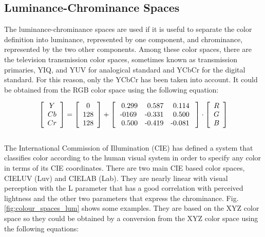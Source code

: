 \documentclass[final,a4paper,12pt,english]{UnicaPhdThesis3}
\begin{document}
\subsection{Luminance-Chrominance Spaces}  %
The luminance-chrominance spaces are used if it is useful to separate the color definition into luminance, represented by one component, and chrominance, represented by the two other components. Among these color spaces, there are the television transmission color spaces, sometimes known as transmission primaries, YIQ, and YUV for analogical standard and YCbCr for the digital standard. For this reason, only the YCbCr has been taken into account. It could be obtained from the RGB color space using the following equation:

\begin{equation}\label{Ycbcr}
\left [ {  \begin{array}{c} Y  \\ Cb   \\ Cr \end{array} } \right ] = \left [{ \begin{array}{c} 0  \\ 128   \\ 128  \end{array} } \right ] +
\left [ { \begin{array}{c c c} \mbox{ 0.299}  & \mbox{ 0.587} & \mbox{ 0.114 } \\ \mbox{-0169} & \mbox{-0.331} & \mbox{ 0.500 } \\ \mbox{ 0.500} & \mbox{-0.419} & \mbox{-0.081 }  \end{array} } \right ] \cdot \left [ { \begin{array}{c} R  \\ G  \\ B  \end{array} } \right ] 
\end{equation}
\\
The International Commission of Illumination (CIE) has defined a system that classifies color according to the human visual system in order to specify any color in terms of its CIE coordinates. There are two main CIE based color spaces, CIELUV (Luv) and CIELAB (Lab). They are nearly linear with visual perception with the L parameter that has a good correlation with perceived lightness and the other two parameters that express the chrominance. Fig. \ref{fig:colour_spaces_lum} shows some examples. They are based on the XYZ color space so they could be obtained by a conversion from the XYZ color space using the following equations:
\end{document}
